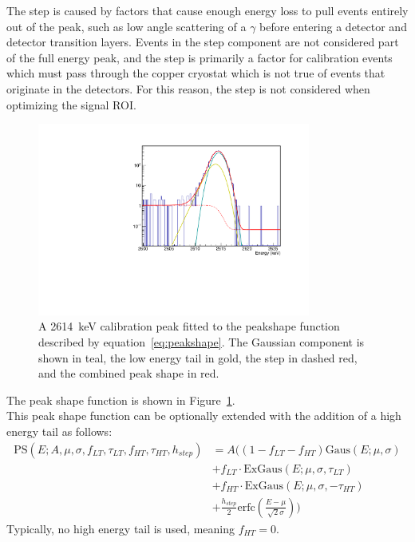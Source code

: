 \documentclass[/main.tex]{subfiles}
\begin{document}
The step is caused by factors that cause enough energy loss to pull events entirely out of the peak, such as low angle scattering of a $\gamma$ before entering a detector and detector transition layers.
Events in the step component are not considered part of the full energy peak, and the step is primarily a factor for calibration events which must pass through the copper cryostat which is not true of events that originate in the detectors.
For this reason, the step is not considered when optimizing the signal ROI.
\begin{figure}
  \centering
  \includegraphics[width=0.8\textwidth]{peakshape}
  \caption[Peak shape function]{\label{fig:peakshape}
    A 2614~keV calibration peak fitted to the peakshape function described by equation~\ref{eq:peakshape}. The Gaussian component is shown in teal, the low energy tail in gold, the step in dashed red, and the combined peak shape in red.
  }
\end{figure}
The peak shape function is shown in Figure~\ref{fig:peakshape}.
\\
This peak shape function can be optionally extended with the addition of a high energy tail as follows:
\begin{equation}
  \begin{aligned}
    \mathrm{PS}(E; A, \mu, \sigma, f_{LT}, \tau_{LT}, f_{HT}, \tau_{HT}, h_{step}) &= A\big((1-f_{LT}-f_{HT})\mathrm{Gaus}(E; \mu, \sigma) \\&+ f_{LT}\cdot\mathrm{ExGaus}(E; \mu, \sigma, \tau_{LT}) \\&+ f_{HT}\cdot\mathrm{ExGaus}(E; \mu, \sigma, -\tau_{HT}) \\&+ \frac{h_{step}}{2}\mathrm{erfc}(\frac{E-\mu}{\sqrt{2}\sigma})\big)
  \end{aligned}
\end{equation}
Typically, no high energy tail is used, meaning $f_{HT}=0$.
\end{document}
